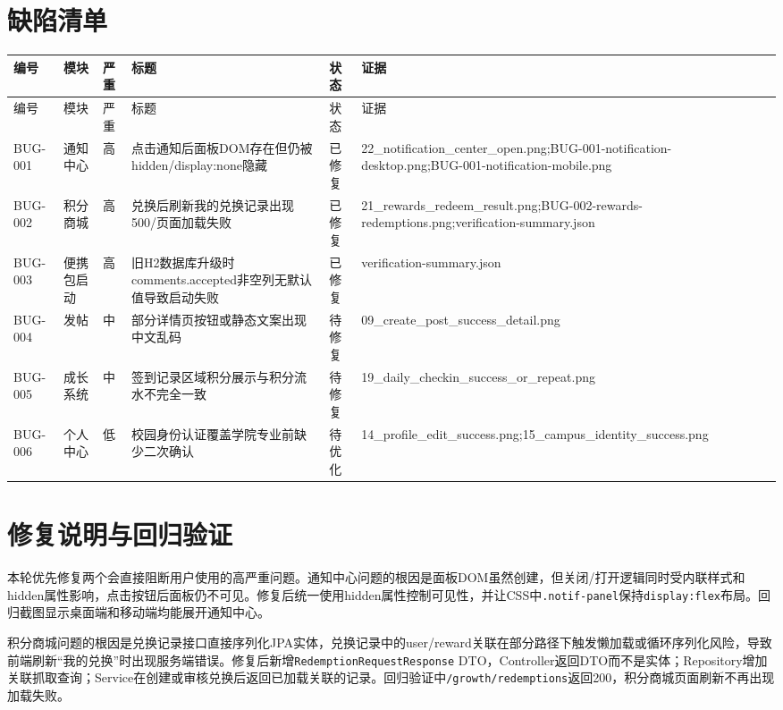 \documentclass[UTF8,zihao=-4]{ctexart}
\begin{document}
\section{缺陷清单}
\begin{longtable}{P{1.5cm}P{2.3cm}P{1.2cm}P{6.2cm}P{1.8cm}P{5.2cm}}
\toprule
编号 & 模块 & 严重 & 标题 & 状态 & 证据\\
\midrule
\endfirsthead
\toprule
编号 & 模块 & 严重 & 标题 & 状态 & 证据\\
\midrule
\endhead
BUG-001 & 通知中心 & 高 & 点击通知后面板DOM存在但仍被hidden/display:none隐藏 & 已修复 & 22\_notification\_center\_open.png;BUG-001-notification-desktop.png;BUG-001-notification-mobile.png \\
BUG-002 & 积分商城 & 高 & 兑换后刷新我的兑换记录出现500/页面加载失败 & 已修复 & 21\_rewards\_redeem\_result.png;BUG-002-rewards-redemptions.png;verification-summary.json \\
BUG-003 & 便携包启动 & 高 & 旧H2数据库升级时comments.accepted非空列无默认值导致启动失败 & 已修复 & verification-summary.json \\
BUG-004 & 发帖 & 中 & 部分详情页按钮或静态文案出现中文乱码 & 待修复 & 09\_create\_post\_success\_detail.png \\
BUG-005 & 成长系统 & 中 & 签到记录区域积分展示与积分流水不完全一致 & 待修复 & 19\_daily\_checkin\_success\_or\_repeat.png \\
BUG-006 & 个人中心 & 低 & 校园身份认证覆盖学院专业前缺少二次确认 & 待优化 & 14\_profile\_edit\_success.png;15\_campus\_identity\_success.png \\
\bottomrule
\end{longtable}

\section{修复说明与回归验证}
本轮优先修复两个会直接阻断用户使用的高严重问题。通知中心问题的根因是面板DOM虽然创建，但关闭/打开逻辑同时受内联样式和hidden属性影响，点击按钮后面板仍不可见。修复后统一使用hidden属性控制可见性，并让CSS中\texttt{.notif-panel}保持\texttt{display:flex}布局。回归截图显示桌面端和移动端均能展开通知中心。

积分商城问题的根因是兑换记录接口直接序列化JPA实体，兑换记录中的user/reward关联在部分路径下触发懒加载或循环序列化风险，导致前端刷新“我的兑换”时出现服务端错误。修复后新增\texttt{RedemptionRequestResponse} DTO，Controller返回DTO而不是实体；Repository增加关联抓取查询；Service在创建或审核兑换后返回已加载关联的记录。回归验证中\texttt{/growth/redemptions}返回200，积分商城页面刷新不再出现加载失败。
\end{document}
